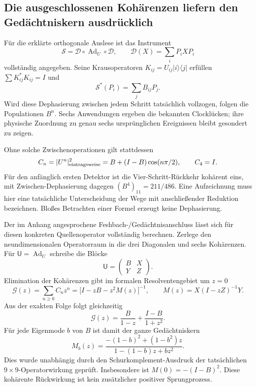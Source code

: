 \subsection{Die ausgeschlossenen Kohärenzen liefern den Gedächtniskern ausdrücklich}
Für die erklärte orthogonale Auslese ist das Instrument
\begin{equation}
\mathcal S=\mathcal D\circ\operatorname{Ad}_U\circ\mathcal D,\qquad
\mathcal D(X)=\sum_iP_iXP_i
\end{equation}
vollständig angegeben. Seine Krausoperatoren
$K_{ij}=U_{ij}|i\rangle\langle j|$ erfüllen
$\sum K_{ij}^*K_{ij}=I$ und
\begin{equation}
\mathcal S^*(P_i)=\sum_jB_{ij}P_j.
\end{equation}
Wird diese Dephasierung zwischen jedem Schritt tatsächlich vollzogen, folgen die Populationen $B^n$. Sechs Anwendungen ergeben die bekannten Clocklücken; ihre physische Zuordnung zu genau sechs ursprünglichen Ereignissen bleibt gesondert zu zeigen.

Ohne solche Zwischenoperationen gilt stattdessen
\begin{equation}
C_n=|U^n|_{\rm eintragsweise}^2
=B+(I-B)\cos(n\pi/2),\qquad C_4=I.
\end{equation}
Für den anfänglich ersten Detektor ist die Vier-Schritt-Rückkehr kohärent eins, mit Zwischen-Dephasierung dagegen $(B^4)_{11}=211/486$.
Eine Aufzeichnung muss hier eine tatsächliche Unterscheidung der Wege mit anschließender Reduktion bezeichnen. Bloßes Betrachten einer Formel erzeugt keine Dephasierung.

Der im Anhang angesprochene Feshbach-/Gedächtnisanschluss lässt sich für diesen konkreten Quellenoperator vollständig berechnen. Zerlege den neundimensionalen Operatorraum in die drei Diagonalen und sechs Kohärenzen. Für
$\mathsf U=\operatorname{Ad}_U$ schreibe die Blöcke
\begin{equation}
\mathsf U=
\begin{pmatrix}B&X\\Y&Z\end{pmatrix}.
\end{equation}
Elimination der Kohärenzen gibt im formalen Resolventengebiet um $z=0$
\begin{equation}
\mathcal G(z)=\sum_{n\ge0}C_nz^n
=\bigl[I-zB-z^2M(z)\bigr]^{-1},
\qquad M(z)=X(I-zZ)^{-1}Y.
\end{equation}
Aus der exakten Folge folgt gleichzeitig
\begin{equation}
\mathcal G(z)=\frac{B}{1-z}+\frac{I-B}{1+z^2}.
\end{equation}
Für jede Eigenmode $b$ von $B$ ist damit der ganze Gedächtniskern
\begin{equation}\label{eq:anchormemory}
\boxed{M_b(z)=
\frac{-(1-b)^2+(1-b^2)z}{1-(1-b)z+bz^2}.}
\end{equation}
Dies wurde unabhängig durch den Schurkomplement-Ausdruck der tatsächlichen $9\times9$-Operatorwirkung geprüft. Insbesondere ist $M(0)=-(I-B)^2$. Diese kohärente Rückwirkung ist kein zusätzlicher positiver Sprungprozess.

